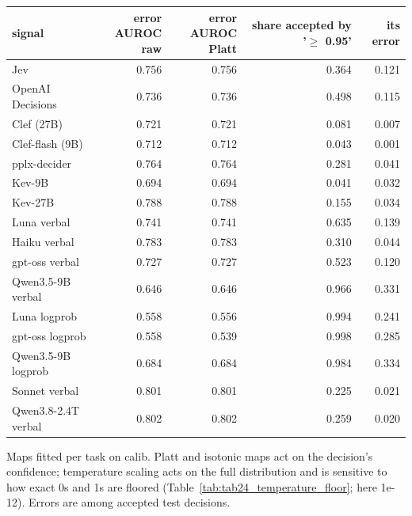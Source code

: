 \begin{table}[t]
\begin{adjustbox}{max width=\linewidth}
\begin{tabular}{lrrrr}
signal & \makecell[br]{error AUROC \\{} raw} & \makecell[br]{error AUROC \\{} Platt} & \makecell[br]{share accepted \\{} by '$\geq$ 0.95'} & its error \\
\midrule
Jev & 0.756 & 0.756 & 0.364 & 0.121 \\
OpenAI Decisions & 0.736 & 0.736 & 0.498 & 0.115 \\
Clef (27B) & 0.721 & 0.721 & 0.081 & 0.007 \\
Clef-flash (9B) & 0.712 & 0.712 & 0.043 & 0.001 \\
pplx-decider & 0.764 & 0.764 & 0.281 & 0.041 \\
Kev-9B & 0.694 & 0.694 & 0.041 & 0.032 \\
Kev-27B & 0.788 & 0.788 & 0.155 & 0.034 \\
Luna verbal & 0.741 & 0.741 & 0.635 & 0.139 \\
Haiku verbal & 0.783 & 0.783 & 0.310 & 0.044 \\
gpt-oss verbal & 0.727 & 0.727 & 0.523 & 0.120 \\
Qwen3.5-9B verbal & 0.646 & 0.646 & 0.966 & 0.331 \\
Luna logprob & 0.558 & 0.556 & 0.994 & 0.241 \\
gpt-oss logprob & 0.558 & 0.539 & 0.998 & 0.285 \\
Qwen3.5-9B logprob & 0.684 & 0.684 & 0.984 & 0.334 \\
Sonnet verbal & 0.801 & 0.801 & 0.225 & 0.021 \\
Qwen3.8-2.4T verbal & 0.802 & 0.802 & 0.259 & 0.020 \\
\bottomrule
\end{tabular}
\end{adjustbox}
\par\smallskip\footnotesize\raggedright Maps fitted per task on calib. Platt and isotonic maps act on the decision's confidence; temperature scaling acts on the full distribution and is sensitive to how exact 0s and 1s are floored (Table~\ref{tab:tab24_temperature_floor}; here 1e-12). Errors are among accepted test decisions.
\end{table}
